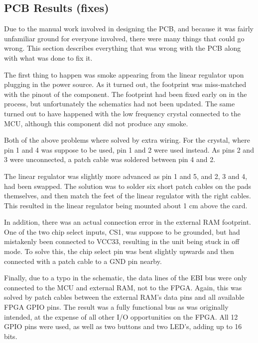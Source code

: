
\subsection{PCB Results (fixes)}

Due to the manual work involved in designing the PCB, and because it was fairly
unfamiliar ground for everyone involved, there were many things that could go
wrong. This section describes everything that was wrong with the PCB along with
what was done to fix it.

The first thing to happen was smoke appearing from the linear regulator upon
plugging in the power source. As it turned out, the footprint was miss-matched
with the pinout of the component. The footprint had been fixed early on in the
process, but unfortunately the schematics had not been updated. The same turned
out to have happened with the low frequency crystal connected to the MCU,
although this component did not produce any smoke.

Both of the above problems where solved by extra wiring. For the crystal, where
pin 1 and 4 was suppose to be used, pin 1 and 2 were used instead. As pins 2 and
3 were unconnected, a patch cable was soldered between pin 4 and 2.

The linear regulator was slightly more advanced as pin 1 and 5, and 2, 3 and 4,
had been swapped. The solution was to solder six short patch cables on the pads
themselves, and then match the feet of the linear regulator with the right
cables. This resulted in the linear regulator being mounted about 1 cm above the
card. 

In addition, there was an actual connection error in the external RAM footprint.
One of the two chip select inputs, CS1, was suppose to be grounded, but had
mistakenly been connected to VCC33, resulting in the unit being stuck in off
mode. To solve this, the chip select pin was bent slightly upwards and then
connected with a patch cable to a GND pin nearby. 

Finally, due to a typo in the schematic, the data lines of the EBI bus were only
connected to the MCU and external RAM, not to the FPGA. Again, this was solved
by patch cables between the external RAM's data pins and all available FPGA GPIO
pins. The result was a fully functional bus as was originally intended, at the
expense of all other I/O opportunities on the FPGA. All 12 GPIO pins were used,
as well as two buttons and two LED's, adding up to 16 bits.
